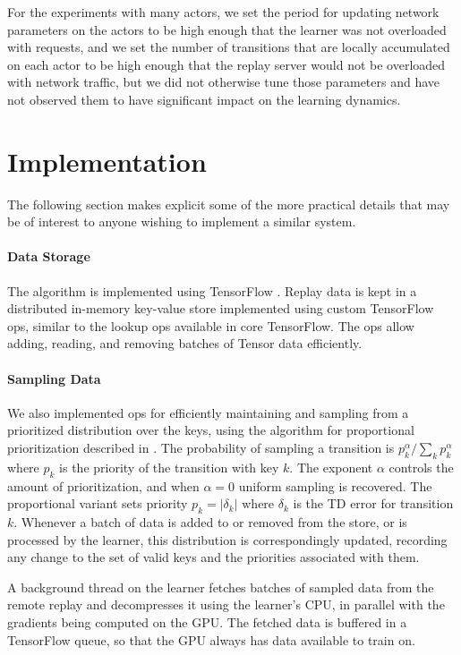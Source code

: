 \documentclass{article} \PassOptionsToPackage{usenames,dvipsnames}{xcolor}
\begin{document}
For the experiments with many actors, we set the period for updating network parameters on the actors to be high enough that the learner was not overloaded with requests, and we set the number of transitions that are locally accumulated on each actor to be high enough that the replay server would not be overloaded with network traffic, but we did not otherwise tune those parameters and have not observed them to have significant impact on the learning dynamics.

\section{Implementation}
\label{sec:app_implementation}

The following section makes explicit some of the more practical details that may be of interest to anyone wishing to implement a similar system.

\paragraph{Data Storage}

The algorithm is implemented using TensorFlow \citep{tensorflow}.  Replay data is kept in a distributed in-memory key-value store implemented using custom TensorFlow ops, similar to the lookup ops available in core TensorFlow. The ops allow adding, reading, and removing batches of Tensor data efficiently.

\paragraph{Sampling Data}

We also implemented ops for efficiently maintaining and sampling from a prioritized distribution over the keys, using the algorithm for proportional prioritization described in \cite{prioritized-replay}. The probability of sampling a transition is $p_k^{\alpha}/\sum_k p_k^{\alpha}$ where $p_k$ is the priority of the transition with key $k$. The exponent $\alpha$ controls the amount of prioritization, and when $\alpha = 0$ uniform sampling is recovered. The proportional variant sets priority $p_k = |\delta_k|$ where $\delta_k$ is the TD error for transition $k$. Whenever a batch of data is added to or removed from the store, or is processed by the learner, this distribution is correspondingly updated, recording any change to the set of valid keys and the priorities associated with them. 

A background thread on the learner fetches batches of sampled data from the remote replay and decompresses it using the learner's CPU, in parallel with the gradients being computed on the GPU. The fetched data is buffered in a TensorFlow queue, so that the GPU always has data available to train on.
\end{document}
